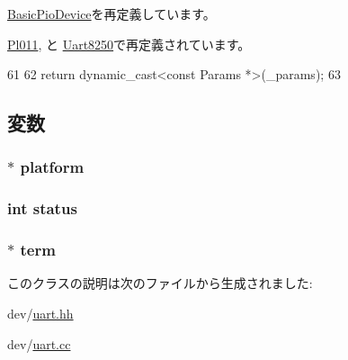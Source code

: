 \hyperlink{classBasicPioDevice_acd3c3feb78ae7a8f88fe0f110a718dff}{BasicPioDevice}を再定義しています。

\hyperlink{classPl011_acd3c3feb78ae7a8f88fe0f110a718dff}{Pl011}, と \hyperlink{classUart8250_acd3c3feb78ae7a8f88fe0f110a718dff}{Uart8250}で再定義されています。


\begin{DoxyCode}
61     {
62         return dynamic_cast<const Params *>(_params);
63     }
\end{DoxyCode}


\subsection{変数}
\hypertarget{classUart_a75b48f1787959a4617f2a599d7c09aab}{
\subsubsection[{platform}]{$\ast$ {\bf platform}}}
\label{classUart_a75b48f1787959a4617f2a599d7c09aab}
\hypertarget{classUart_a6e27f49150e9a14580fb313cc2777e00}{
\subsubsection[{status}]{\setlength{\rightskip}{0pt plus 5cm}int {\bf status}}}
\label{classUart_a6e27f49150e9a14580fb313cc2777e00}
\hypertarget{classUart_a61b35a33209eb5f0de1f6f97f543ef92}{
\subsubsection[{term}]{$\ast$ {\bf term}}}
\label{classUart_a61b35a33209eb5f0de1f6f97f543ef92}


このクラスの説明は次のファイルから生成されました:\begin{DoxyCompactItemize}
\item 
dev/\hyperlink{uart_8hh}{uart.hh}\item 
dev/\hyperlink{uart_8cc}{uart.cc}\end{DoxyCompactItemize}
